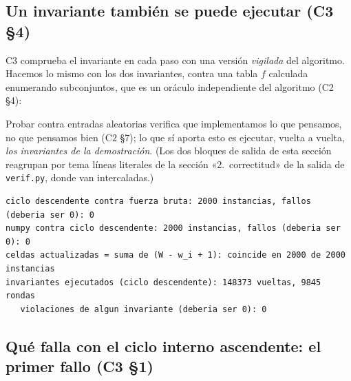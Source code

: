 \documentclass[11pt]{article}
\begin{document}
\subsection*{Un invariante también se puede ejecutar (C3 §4)}

C3 comprueba el invariante en cada paso con una versión \emph{vigilada} del algoritmo. Hacemos lo mismo con
los dos invariantes, contra una tabla $f$ calculada enumerando subconjuntos, que es un oráculo independiente
del algoritmo (C2 §4):



Probar contra entradas aleatorias verifica que implementamos lo que pensamos, no que pensamos bien (C2 §7);
lo que sí aporta esto es ejecutar, vuelta a vuelta, \emph{los invariantes de la demostración}. (Los dos bloques de
salida de esta sección reagrupan por tema líneas literales de la sección «2.\ correctitud» de la salida de
\texttt{verif.py}, donde van intercaladas.)
\begin{lstlisting}[style=salida,basicstyle=\ttfamily\footnotesize\color{black},columns=fixed]
ciclo descendente contra fuerza bruta: 2000 instancias, fallos (deberia ser 0): 0
numpy contra ciclo descendente: 2000 instancias, fallos (deberia ser 0): 0
celdas actualizadas = suma de (W - w_i + 1): coincide en 2000 de 2000 instancias
invariantes ejecutados (ciclo descendente): 148373 vueltas, 9845 rondas
   violaciones de algun invariante (deberia ser 0): 0
\end{lstlisting}

\subsection*{Qué falla con el ciclo interno ascendente: el primer fallo (C3 §1)}
\end{document}
